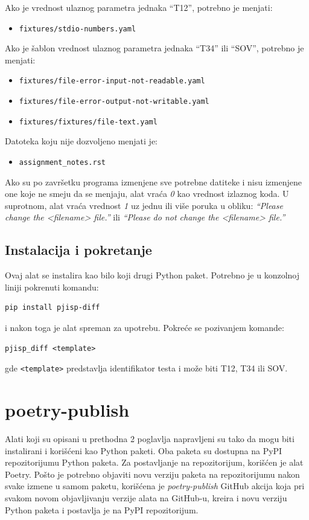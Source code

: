 \documentclass[12pt]{report}
\begin{document}
Ako je vrednost ulaznog parametra jednaka ``T12'', potrebno je menjati:

\begin{itemize}
    \item \texttt{fixtures/stdio-numbers.yaml}
\end{itemize}

Ako je šablon vrednost ulaznog parametra jednaka ``T34'' ili ``SOV'', potrebno je menjati:

\begin{itemize}
    \item \texttt{fixtures/file-error-input-not-readable.yaml}
    \item \texttt{fixtures/file-error-output-not-writable.yaml}
    \item \texttt{fixtures/fixtures/file-text.yaml}
\end{itemize}

Datoteka koju nije dozvoljeno menjati je:

\begin{itemize}
    \item \texttt{assignment\_notes.rst}
\end{itemize}

Ako su po završetku programa izmenjene sve potrebne datiteke i nisu izmenjene one koje ne smeju da se menjaju, alat vraća \textit{0} kao vrednost izlaznog koda. U suprotnom, alat vraća vrednost \textit{1} uz jednu ili više poruka u obliku: \textit{``Please change the <filename> file.''} ili \textit{``Please do not change the <filename> file.''}

\subsection{Instalacija i pokretanje}
Ovaj alat se instalira kao bilo koji drugi Python paket. Potrebno je u konzolnoj liniji pokrenuti komandu:

\begin{verbatim}
pip install pjisp-diff
\end{verbatim}

i nakon toga je alat spreman za upotrebu. Pokreće se pozivanjem komande:

\begin{verbatim}
pjisp_diff <template>
\end{verbatim}

gde \texttt{<template>} predstavlja identifikator testa i može biti T12, T34 ili SOV.

\section{poetry-publish}
Alati koji su opisani u prethodna 2 poglavlja napravljeni su tako da mogu biti instalirani i korišćeni kao Python paketi. Oba paketa su dostupna na PyPI repozitorijumu Python paketa. Za postavljanje na repozitorijum, korišćen je alat Poetry. Pošto je potrebno objaviti novu verziju paketa na repozitorijumu nakon svake izmene u samom paketu, korišćena je \textit{poetry-publish} \cite{poetry-publish-repo} GitHub akcija koja pri svakom novom objavljivanju verzije alata na GitHub-u, kreira i novu verziju Python paketa i postavlja je na PyPI repozitorijum.
\end{document}
